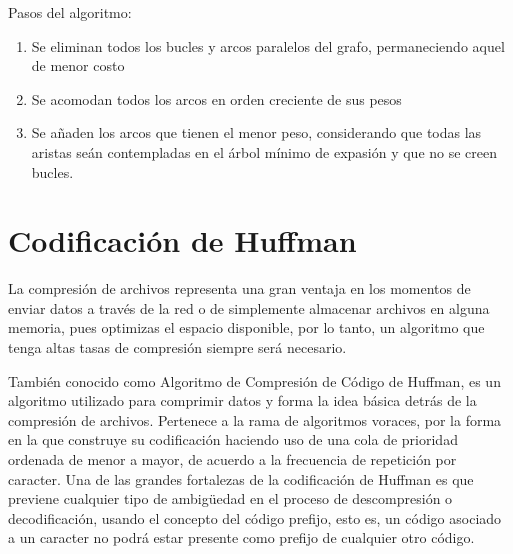     Pasos del algoritmo:
    \begin{enumerate}
        \item Se eliminan todos los bucles y arcos paralelos del grafo, permaneciendo aquel de menor costo
        \item Se acomodan todos los arcos en orden creciente de sus pesos
        \item Se añaden los arcos que tienen el menor peso, considerando que todas las aristas seán contempladas en el árbol mínimo de expasión y que no se creen bucles.
    \end{enumerate}
    

\section*{Codificación de Huffman}
    La compresión de archivos representa una gran ventaja en los momentos de enviar datos a través de la red o de simplemente almacenar archivos en alguna memoria, pues optimizas el espacio disponible, por lo tanto, un algoritmo que tenga altas tasas de compresión siempre será necesario.
    
    También conocido como Algoritmo de Compresión de Código de Huffman, es un algoritmo utilizado para comprimir datos y forma la idea básica detrás de la compresión de archivos. Pertenece a la rama de algoritmos voraces, por la forma en la que construye su codificación haciendo uso de una cola de prioridad ordenada de menor a mayor, de acuerdo a la frecuencia de repetición por caracter. Una de las grandes fortalezas de la codificación de Huffman es que previene cualquier tipo de ambigüedad en el proceso de descompresión o decodificación, usando el concepto del código prefijo, esto es, un código asociado a un caracter no podrá estar presente como prefijo de cualquier otro código. \\
    
    
    
    
    
    